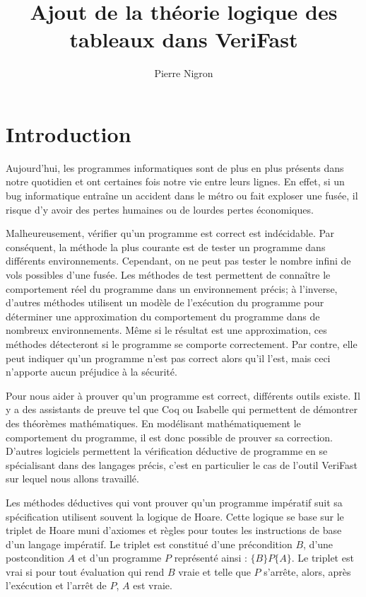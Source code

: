 \documentclass[11pt,openany]{article}
\title{Ajout de la th\'eorie logique des tableaux dans VeriFast}
\author{Pierre Nigron}
\newcommand{\verifast}{VeriFast}
\begin{document}
\maketitle
\sloppy

\tableofcontents

\section*{Introduction}
		Aujourd'hui, les programmes informatiques sont de plus en plus pr\'esents dans notre quotidien et ont certaines fois notre vie entre leurs lignes. En effet, si un bug informatique entra\^ine un accident dans le m\'etro ou fait exploser une fus\'ee, il risque d'y avoir des pertes humaines ou de lourdes pertes \'economiques.
		
		Malheureusement, v\'erifier qu'un programme est correct est ind\'ecidable. Par cons\'equent, la m\'ethode la plus courante est de tester un programme dans diff\'erents environnements. Cependant, on ne peut pas tester le nombre infini de vols possibles d'une fus\'ee. Les m\'ethodes de test permettent de conna\^itre le comportement r\'eel du programme dans un environnement pr\'ecis; \`a l'inverse, d'autres m\'ethodes utilisent un mod\`ele de l'ex\'ecution du programme pour d\'eterminer une approximation du comportement du programme dans de nombreux environnements. M\^eme si le r\'esultat est une approximation, ces m\'ethodes d\'etecteront si le programme se comporte correctement. Par contre, elle peut indiquer qu'un programme n'est pas correct alors qu'il l'est, mais ceci n'apporte aucun pr\'ejudice \`a la s\'ecurit\'e.

		Pour nous aider \`a prouver qu'un programme est correct, diff\'erents outils existe. Il y a des assistants de preuve tel que Coq ou Isabelle qui permettent de d\'emontrer des th\'eor\`emes math\'ematiques. En mod\'elisant math\'ematiquement le comportement du programme, il est donc possible de prouver sa correction. D'autres logiciels permettent la v\'erification d\'eductive de programme en se sp\'ecialisant dans des langages pr\'ecis, c'est en particulier le cas de l'outil \verifast{} sur lequel nous allons travaill\'e. 
	
	Les m\'ethodes d\'eductives qui vont prouver qu'un programme imp\'eratif suit sa sp\'ecification utilisent souvent la logique de Hoare. Cette logique se base sur le triplet de Hoare muni d'axiomes et r\`egles pour toutes les instructions de base d'un langage imp\'eratif. Le triplet est constitu\'e d'une pr\'econdition $B$, d'une postcondition $A$ et d'un programme $P$ repr\'esent\'e ainsi : $\{B\}P\{A\}$. Le triplet est vrai si pour tout \'evaluation qui rend $B$ vraie et telle que $P$ s'arr\^ete, alors, apr\`es l'ex\'ecution et l'arr\^et de $P$, $A$ est vraie.
	
\end{document}
